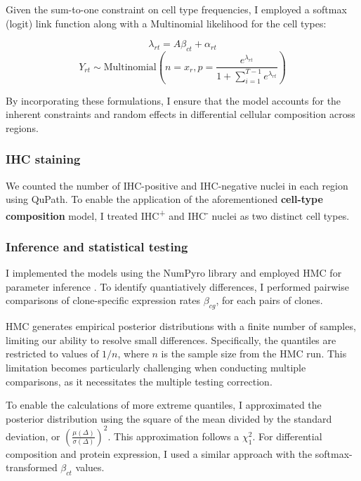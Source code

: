 Given the sum-to-one constraint on cell type frequencies, I employed a softmax (logit) link function along with a Multinomial likelihood for the cell types:

\begin{equation}
\lambda_{rt} = A\beta_{ct} + \alpha_{rt}
\end{equation}
\begin{equation}
Y_{rt} \sim \text{Multinomial}\left(n=x_r, p=\frac{e^{\lambda_{rt}}}{1 + \sum_{i=1}^{T-1} e^{\lambda_{rt}}}\right)
\end{equation}

By incorporating these formulations, I ensure that the model accounts for the inherent constraints and random effects in differential cellular composition across regions.

\subsubsection*{IHC staining}
We counted the number of IHC-positive and IHC-negative nuclei in each region using QuPath. To enable the application of the aforementioned \textbf{cell-type composition} model, I treated IHC\textsuperscript{+} and IHC\textsuperscript{-} nuclei as two distinct cell types.

\subsubsection*{Inference and statistical testing}

I implemented the models using the \ac{NumPyro} library and employed \acf{HMC} for parameter inference . To identify quantiatively differences, I performed pairwise comparisons of clone-specific expression rates $\beta_{cg}$, for each pairs of clones.

\ac{HMC} generates empirical posterior distributions with a finite number of samples, limiting our ability to resolve small differences. Specifically, the quantiles are restricted to values of $1/n$, where $n$ is the sample size from the \ac{HMC} run. This limitation becomes particularly challenging when conducting multiple comparisons, as it necessitates the multiple testing correction. 

To enable the calculations of more extreme quantiles, I approximated the posterior distribution using the square of the mean divided by the standard deviation, or $\left(\frac{\mu(\Delta)}{\sigma(\Delta)}\right)^2$. This approximation follows a $\chi_{1}^{2}$. For differential composition and protein expression, I used a similar approach with the softmax-transformed $\beta_{ct}$ values. 

